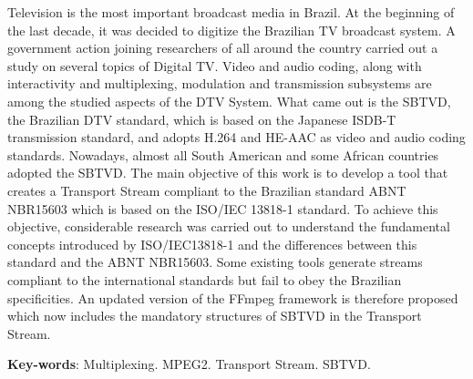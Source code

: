 \documentclass[
	12pt,				%
	openright,			%
	twoside,			%
	a4paper,			%
	brazil,
	french,				%
	english
	]{abntex2}
\begin{document}
\begin{resumo}[Abstract]


Television is the most important broadcast media in Brazil. At the beginning of the last decade, it was decided to digitize the Brazilian TV broadcast system. A government action joining researchers of all around the country carried out a study on several topics of Digital TV. Video and audio coding, along with interactivity and multiplexing, modulation and transmission subsystems are among the studied aspects of the DTV System. What came out is the SBTVD, the Brazilian DTV standard, which is based on the Japanese ISDB-T transmission standard, and adopts H.264 and HE-AAC as video and audio coding standards. Nowadays, almost all South American and some African countries adopted the SBTVD. The main objective of this work is to develop a tool that creates a Transport Stream compliant to the Brazilian standard ABNT NBR15603 which is based on the ISO/IEC 13818-1 standard. To achieve this objective, considerable research was carried out to understand the fundamental concepts introduced by ISO/IEC13818-1 and the differences between this standard and the ABNT NBR15603. Some existing tools generate streams compliant to the international standards but fail to obey the Brazilian specificities. An updated version of the FFmpeg framework is therefore proposed which now includes the mandatory structures of SBTVD in the Transport Stream.

   \vspace{\onelineskip}
 
   \noindent 
   \textbf{Key-words}: Multiplexing. MPEG2. Transport Stream. SBTVD.
 
\end{resumo}
\end{document}
